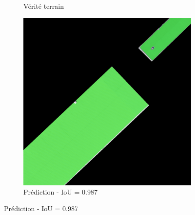 \begin{figure}[H]
\begin{subfigure}{0.32\textwidth}
    \caption{Vérité terrain}
\end{subfigure}
\hfill
\begin{subfigure}{0.32\textwidth}
    \includegraphics[width=\textwidth]{02-main//figures/ch4/kfold_ensembles/segformer_tu-regnety_080.ra3_in1k/best_cases/best_3_iou0.987_24961121_tile_15_10_cc6553_overlay_pred.png}
    \caption{Prédiction - IoU = 0.987}
\end{subfigure}

\vspace{0.35cm}


\end{figure}

